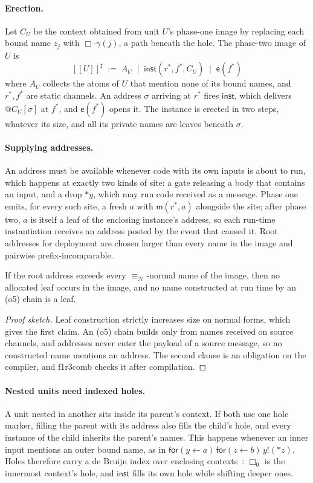\documentclass[acmsmall,screen,review,anonymous]{acmart}
\makeatletter
\newcommand{\quo}[1]{@#1}
\newcommand{\drp}[1]{{*}#1}
\newcommand{\inp}[3]{\mathsf{for}(#1 \leftarrow #2)\,#3}
\newcommand{\out}[2]{#1!(#2)}
\newcommand{\enc}[1]{[\![#1]\!]}
\newcommand{\nameq}{\equiv_{\mathcal{N}}}
\newcommand{\mm}{\mathsf{m}}
\newcommand{\ev}{\mathsf{e}}
\newcommand{\inst}{\mathsf{inst}}
\newcommand{\hole}{\Box}
\newcommand{\tool}{\textsf{f1r3comb}}
\makeatother
\begin{document}
\paragraph{Erection.} Let $C_{U}$ be the context obtained from unit $U$'s
phase-one image by replacing each bound name $z_{j}$ with $\hole\cdot\gamma(j)$,
a path beneath the hole. The phase-two image of $U$ is
\[
  \enc{U}^{\sharp} \;:=\; A_{U} \;\mid\; \inst(r^{*},f^{*},C_{U}) \;\mid\; \ev(f^{*})
\]
where $A_{U}$ collects the atoms of $U$ that mention none of its bound names,
and $r^{*}, f^{*}$ are static channels. An address $\sigma$ arriving at
$r^{*}$ fires $\inst$, which delivers $\quo{C_{U}[\sigma]}$ at $f^{*}$, and
$\ev(f^{*})$ opens it. The instance is erected in two steps, whatever its
size, and all its private names are leaves beneath $\sigma$.

\paragraph{Supplying addresses.} An address must be available whenever code
with its own inputs is about to run, which happens at exactly two kinds of
site: a gate releasing a body that contains an input, and a drop $\drp{y}$,
which may run code received as a message. Phase one emits, for every such
site, a fresh $a$ with $\mm(r^{*},a)$ alongside the site; after phase two, $a$
is itself a leaf of the enclosing instance's address, so each run-time
instantiation receives an address posted by the event that caused it. Root
addresses for deployment are chosen larger than every name in the image and
pairwise prefix-incomparable.

\begin{lemma}[Freshness]
\label{lem:fresh}
If the root address exceeds every $\nameq$-normal name of the image, then no
allocated leaf occurs in the image, and no name constructed at run time by
an (o5) chain is a leaf.
\end{lemma}

\begin{proof}[Proof sketch]
Leaf construction strictly increases size on normal forms, which gives the
first claim. An (o5) chain builds only from names received on source
channels, and addresses never enter the payload of a source message, so no
constructed name mentions an address. The second clause is an obligation on
the compiler, and \tool{} checks it after compilation.
\end{proof}

\paragraph{Nested units need indexed holes.} A unit nested in another sits
inside its parent's context. If both use one hole marker, filling the parent
with its address also fills the child's hole, and every instance of the
child inherits the parent's names. This happens whenever an inner input
mentions an outer bound name, as in
$\inp{y}{a}{\inp{z}{b}{\out{y}{\drp{z}}}}$. Holes therefore carry a de Bruijn
index over enclosing contexts~\cite{deBruijn72}: $\hole_{0}$ is the innermost
context's hole, and $\inst$ fills its own hole while shifting deeper ones.
\end{document}
